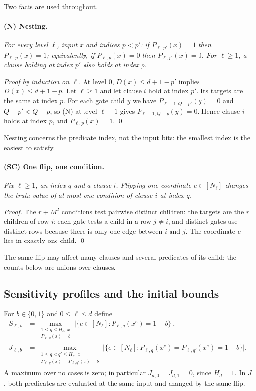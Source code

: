 \documentclass[11pt]{article}
\theoremstyle{definition}
\theoremstyle{remark}
\begin{document}
Two facts are used throughout.

\paragraph{(N) Nesting.}
\emph{For every level $\ell$, input $x$ and indices $p<p'$: if
$P_{\ell,p'}(x)=1$ then $P_{\ell,p}(x)=1$; equivalently, if
$P_{\ell,p}(x)=0$ then $P_{\ell,p'}(x)=0$. For $\ell\ge1$, a clause holding
at index $p'$ also holds at index $p$.}

\emph{Proof by induction on $\ell$.} At level $0$, $D(x)\le d+1-p'$ implies
$D(x)\le d+1-p$. Let $\ell\ge1$ and let clause $i$ hold at index $p'$. Its
targets are the same at index $p$. For each gate child $y$ we have
$P_{\ell-1,Q-p'}(y)=0$ and $Q-p'<Q-p$, so (N) at level $\ell-1$ gives
$P_{\ell-1,Q-p}(y)=0$. Hence clause $i$ holds at index $p$, and
$P_{\ell,p}(x)=1$. \qed

Nesting concerns the predicate index, not the input bits: the smallest index
is the easiest to satisfy.

\paragraph{(SC) One flip, one condition.}
\emph{Fix $\ell\ge1$, an index $q$ and a clause $i$. Flipping one coordinate
$e\in[N_\ell]$ changes the truth value of at most one condition of clause $i$
at index $q$.}

\emph{Proof.} The $r+M^2$ conditions test pairwise distinct children: the
targets are the $r$ children of row $i$; each gate tests a child in a row
$j\ne i$, and distinct gates use distinct rows because there is only one
edge between $i$ and $j$. The coordinate $e$ lies in exactly one child. \qed

The same flip may affect many clauses and several predicates of its child;
the counts below are unions over clauses.

\subsection{Sensitivity profiles and the initial bounds}

For $b\in\{0,1\}$ and $0\le\ell\le d$ define
\begin{align*}
 S_{\ell,b}&=\max_{\substack{1\le q\le H_\ell,\ x\\ P_{\ell,q}(x)=b}}
 \bigl|\{e\in[N_\ell]:P_{\ell,q}(x^e)=1-b\}\bigr|,\\
 J_{\ell,b}&=\max_{\substack{1\le q<q'\le H_\ell,\ x\\
                         P_{\ell,q}(x)=P_{\ell,q'}(x)=b}}
 \bigl|\{e\in[N_\ell]:P_{\ell,q}(x^e)=P_{\ell,q'}(x^e)=1-b\}\bigr|.
\end{align*}
A maximum over no cases is zero; in particular $J_{d,0}=J_{d,1}=0$, since
$H_d=1$. In $J$, both predicates are evaluated at the same input and changed
by the same flip.
\end{document}
